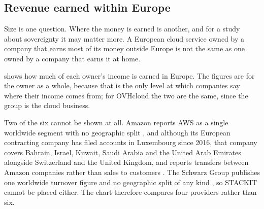 \subsection{Revenue earned within Europe}

Size is one question. Where the money is earned is another, and for a study about
sovereignty it may matter more. A European cloud service owned by a company that
earns most of its money outside Europe is not the same as one owned by a company
that earns it at home.

 shows how much of each owner's income is earned in Europe.
The figures are for the owner as a whole, because that is the only level at which
companies say where their income comes from; for OVHcloud the two are the same,
since the group is the cloud business.

Two of the six cannot be shown at all. Amazon reports \acs{AWS} as a single
worldwide segment with no geographic split \cite{Amazon_10K_2025}, and although
its European contracting company has filed accounts in Luxembourg since 2016, that
company covers Bahrain, Israel, Kuwait, Saudi Arabia and the United Arab Emirates
alongside Switzerland and the United Kingdom, and reports transfers between Amazon
companies rather than sales to customers
\cite{AWS_EMEA_Accounts,AWS_Europe_Territory}. The Schwarz Group publishes one
worldwide turnover figure and no geographic split of any kind
\cite{Schwarz_Figures_FY2025}, so STACKIT cannot be placed either. The chart
therefore compares four providers rather than six.

